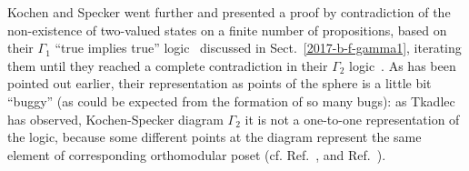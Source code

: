 \documentclass[%
  twocolumn,
 showpacs,
 showkeys,
 preprintnumbers,
 amsmath,amssymb,
 aps,
  pra,
  longbibliography,
 floatfix,
 ]{revtex4-1}
\begin{document}
Kochen and Specker went further and presented a  proof by contradiction
of the non-existence of two-valued states on a finite number of propositions,
based on their  $\Gamma_1$ ``true implies true'' logic~\cite[p.~68]{kochen1} discussed in Sect.~\ref{2017-b-f-gamma1},
iterating them until they reached a complete contradiction in their $\Gamma_2$ logic~\cite[p.~69]{kochen1}.
As has been pointed out earlier, their representation as points of the sphere is a little bit ``buggy'' (as could be expected from the formation of so many bugs):
as Tkadlec has observed, Kochen-Specker diagram $\Gamma_2$ it is not a one-to-one representation of the logic, because some different points
at the diagram represent the same element of corresponding orthomodular
poset (cf. Ref.~\cite[p.~5390]{svozil-tkadlec}, and Ref.~\cite[p.]{tkadlec-01}).
\end{document}
